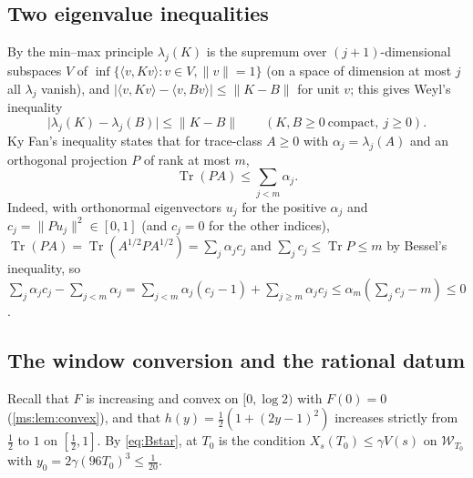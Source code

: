 \documentclass[11pt,a4paper]{amsart}
\theoremstyle{definition}
\theoremstyle{remark}
\numberwithin{equation}{section}
\DeclareMathOperator{\Tr}{Tr}        %
\newcommand{\Wwin}{\mathcal{W}}      %
\newcommand{\ip}[2]{\langle #1,#2\rangle}  %
\newcommand{\norm}[1]{\lVert #1\rVert}     %
\newcommand{\abs}[1]{\lvert #1\rvert}      %
\newcommand{\TT}{\mathbb{T}}               %
\newcommand{\Zc}{\mathcal{Z}}              %
\newcommand{\XT}[2]{X_{#1}(#2)}            %
\newcommand{\Vol}[1]{V(#1)}                %
\newcommand{\Bstar}{\text{\upshape(B$^{*}$)}}       %
\begin{document}
\subsection{Two eigenvalue inequalities}
By the min--max principle $\lambda_j(K)$ is the supremum over $(j+1)$-dimensional subspaces $V$ of $\inf\{\ip{v}{Kv}:v\in V,\norm v=1\}$ (on a space of dimension at most $j$ all $\lambda_j$ vanish), and $\abs{\ip{v}{Kv}-\ip{v}{Bv}}\le\norm{K-B}$ for unit $v$; this gives Weyl's inequality
\[
\abs{\lambda_j(K)-\lambda_j(B)}\le\norm{K-B}\qquad(K,B\ge0\ \text{compact},\ j\ge0).
\]
Ky Fan's inequality states that for trace-class $A\ge0$ with $\alpha_j=\lambda_j(A)$ and an orthogonal projection $P$ of rank at most $m$,
\[
\Tr(PA)\le\textstyle\sum_{j<m}\alpha_j .
\]
Indeed, with orthonormal eigenvectors $u_j$ for the positive $\alpha_j$ and $c_j=\norm{Pu_j}^2\in[0,1]$ (and $c_j=0$ for the other indices), $\Tr(PA)=\Tr(A^{1/2}PA^{1/2})=\sum_j\alpha_jc_j$ and $\sum_jc_j\le\Tr P\le m$ by Bessel's inequality, so $\sum_j\alpha_jc_j-\sum_{j<m}\alpha_j=\sum_{j<m}\alpha_j(c_j-1)+\sum_{j\ge m}\alpha_jc_j\le\alpha_m(\sum_jc_j-m)\le0$.

\subsection{The window conversion and the rational datum}
Recall that $F$ is increasing and convex on $[0,\log2)$ with $F(0)=0$ (\cref{ms:lem:convex}), and that $h(y)=\frac12(1+(2y-1)^2)$ increases strictly from $\frac12$ to $1$ on $[\frac12,1]$. By \eqref{eq:Bstar}, \Bstar{} at $T_0$ is the condition $\XT{s}{T_0}\le\gamma\Vol{s}$ on $\Wwin_{T_0}$ with $y_0=2\gamma(96T_0)^3\le\frac1{20}$.
\end{document}

